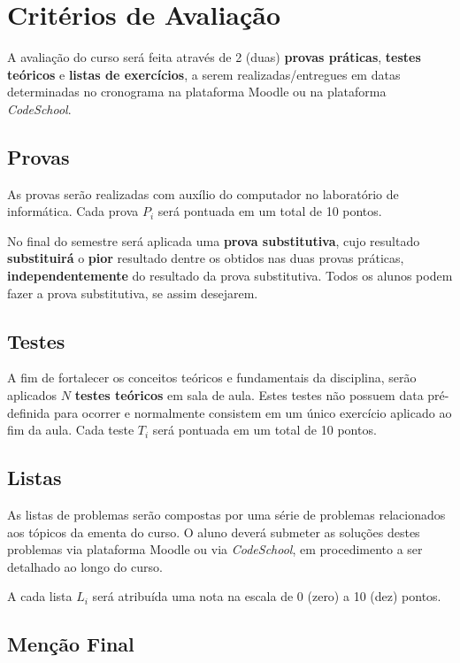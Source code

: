 \section{Critérios de Avaliação}

A avaliação do curso será feita através de 2 (duas) \textbf{provas práticas},
\textbf{testes teóricos} e \textbf{listas de exercícios}, a
serem realizadas/entregues em datas determinadas no cronograma na plataforma
Moodle ou na plataforma \textit{CodeSchool}.

\subsection{Provas}

As provas serão realizadas com auxílio do computador no laboratório de informática. Cada prova $P_i$ será pontuada em um total de 10 pontos.

No final do semestre será aplicada uma \textbf{prova substitutiva}, cujo resultado \textbf{substituirá} o \textbf{pior} resultado dentre os obtidos nas duas provas práticas, \textbf{independentemente} do resultado da prova substitutiva. Todos os alunos podem fazer a prova substitutiva, se assim desejarem.

\subsection{Testes}

A fim de fortalecer os conceitos teóricos e fundamentais da disciplina, serão aplicados $N$ \textbf{testes teóricos} em sala de aula. Estes testes não possuem data pré-definida para ocorrer e normalmente consistem em um único exercício aplicado ao fim da aula. Cada teste $T_i$ será pontuada em um total de 10 pontos.

\subsection{Listas}

As listas de problemas serão compostas por uma série de problemas relacionados aos tópicos da ementa do curso. O aluno deverá submeter as soluções destes problemas via plataforma Moodle ou via \textit{CodeSchool}, em procedimento a ser detalhado ao longo do curso.

A cada lista $L_i$ será atribuída uma nota na escala de 0 (zero) a 10 (dez) pontos.

\subsection{Menção Final}

